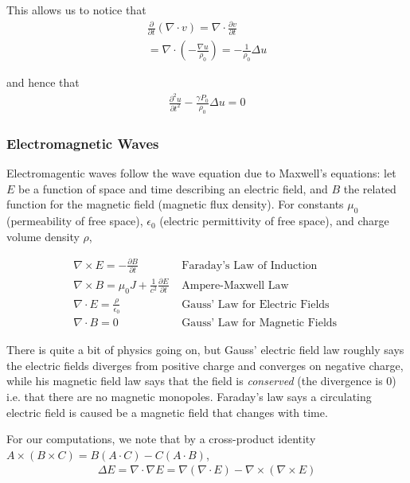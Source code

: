 \documentclass{article}
\newcommand{\pd}{\partial}
\begin{document}
	This allows us to notice that
	\begin{align*}
		\frac{\pd}{\pd t}( \nabla \cdot v) = \nabla \cdot \frac{\pd v}{\pd t} \\
		= \nabla \cdot ( -\frac{\nabla u}{\rho_0}) = -\frac{1}{\rho_0} \Delta u
	\end{align*}
	
	and hence that 
	\begin{align*}
		\frac{\pd^{2} u}{\pd t^{2}} - \frac{\gamma P_0}{\rho_0} \Delta u = 0
	\end{align*}
	
	
	
	
	
	\subsubsection{Electromagnetic Waves}
	
	Electromagentic waves follow the wave equation due to Maxwell's equations: let $E$ be a function of space and time describing an electric field, and $B$ the related function for the magnetic field (magnetic flux density). For constants $\mu_0$ (permeability of free space), $\epsilon_0$ (electric permittivity of free space), and charge volume density $\rho$, 
	
	\begin{align*}
		\nabla \times E = -\frac{\pd B}{\pd t} & \text{ Faraday's Law of Induction }\\
		\nabla \times B = \mu_0 J + \frac{1}{c^2} \frac{\pd E}{ \pd t}  & \text{ Ampere-Maxwell Law }\\
		\nabla \cdot E = \frac{\rho}{\epsilon_0}  & \text{ Gauss' Law for Electric Fields } \\
		\nabla \cdot B = 0 & \text{ Gauss' Law for Magnetic Fields }
	\end{align*}
	
	There is quite a bit of physics going on, but Gauss' electric field law roughly says the electric fields diverges from positive charge and converges on negative charge, while his magnetic field law says that the field is \textit{conserved} (the divergence is 0) i.e. that there are no magnetic monopoles. Faraday's law says a circulating electric field is caused be a magnetic field that changes with time. 
	
	For our computations, we note that by a cross-product identity $A \times (B \times C) = B(A \cdot C) - C(A \cdot B)$, 
	\begin{align*}
		\Delta E = \nabla \cdot \nabla E = \nabla(\nabla \cdot E) - \nabla \times (\nabla \times E)
	\end{align*}
	
\end{document}
